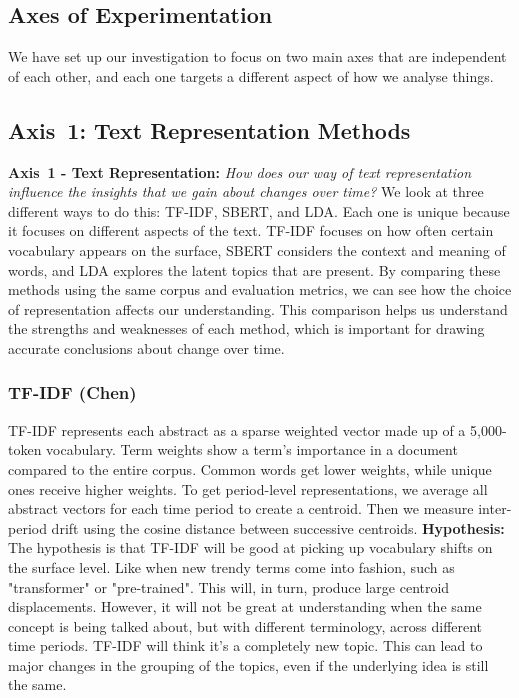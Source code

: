 \documentclass[11pt]{article}
\begin{document}
\subsection{Axes of Experimentation}
We have set up our investigation to focus on two main axes that are independent of each other, and each one targets a different aspect of how we analyse things.

\subsection{Axis~1: Text Representation Methods}
\textbf{Axis~1 - Text Representation:} \textit{How does our way of text representation influence the insights that we gain about changes over time?}
We look at three different ways to do this: TF-IDF, SBERT, and LDA. Each one is unique because it focuses on different aspects of the text. TF-IDF focuses on how often certain vocabulary appears on the surface, SBERT considers the context and meaning of words, and LDA explores the latent topics that are present. By comparing these methods using the same corpus and evaluation metrics, we can see how the choice of representation affects our understanding. This comparison helps us understand the strengths and weaknesses of each method, which is important for drawing accurate conclusions about change over time.

\subsubsection{TF-IDF (Chen)}
TF-IDF represents each abstract as a sparse weighted vector made up of a 5{,}000-token vocabulary. Term weights show a term's importance in a document compared to the entire corpus. Common words get lower weights, while unique ones receive higher weights. To get period-level representations, we average all abstract vectors for each time period to create a centroid. Then we measure inter-period drift using the cosine distance between successive centroids.
\textbf{Hypothesis:} The hypothesis is that TF-IDF will be good at picking up vocabulary shifts on the surface level. Like when new trendy terms come into fashion, such as "transformer" or "pre-trained". This will, in turn, produce large centroid displacements. However, it will not be great at understanding when the same concept is being talked about, but with different terminology, across different time periods. TF-IDF will think it's a completely new topic. This can lead to major changes in the grouping of the topics, even if the underlying idea is still the same.
\end{document}
